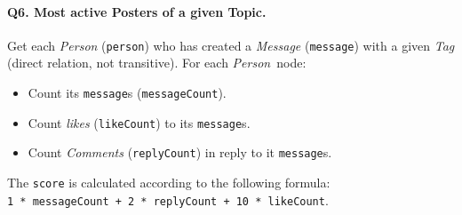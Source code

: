 \paragraph{\textbf{Q6}. Most active Posters of a given Topic.}
Get each \emph{Person} (\texttt{person}) who has created a
\emph{Message} (\texttt{message}) with a given \emph{Tag} (direct
relation, not transitive). For each \emph{Person}~node:
\begin{itemize}
\tightlist
\item
  Count its \texttt{message}s (\texttt{messageCount}).
\item
  Count \emph{likes} (\texttt{likeCount}) to its \texttt{message}s.
\item
  Count \emph{Comments} (\texttt{replyCount}) in reply to it
  \texttt{message}s.
\end{itemize}
The \texttt{score} is calculated according to the following formula:
\texttt{1\ *\ messageCount\ +\ 2\ *\ replyCount\ +\ 10\ *\ likeCount}.
